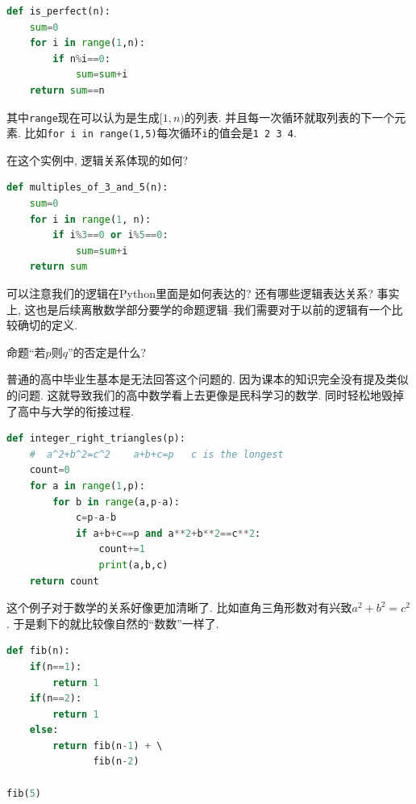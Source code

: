 
\begin{lstlisting}[language=Python]
def is_perfect(n):
    sum=0
    for i in range(1,n):
        if n%i==0:
            sum=sum+i
    return sum==n    
\end{lstlisting}

其中\texttt{range}现在可以认为是生成$[1,n)$的列表. 并且每一次循环就取列表的下一个元素. 比如\texttt{for i in range(1,5)}每次循环\texttt{i}的值会是\texttt{1 2 3 4}. 

在这个实例中, 逻辑关系体现的如何? 


\begin{lstlisting}[language=Python]
def multiples_of_3_and_5(n):
    sum=0
    for i in range(1, n):
        if i%3==0 or i%5==0:
            sum=sum+i
    return sum   	
\end{lstlisting}

可以注意我们的逻辑在Python里面是如何表达的? 还有哪些逻辑表达关系? 事实上, 这也是后续离散数学部分要学的命题逻辑--我们需要对于以前的逻辑有一个比较确切的定义. 

\begin{bonus}
	命题``若$p$则$q$''的否定是什么? 
\end{bonus}

普通的高中毕业生基本是无法回答这个问题的. 因为课本的知识完全没有提及类似的问题. 这就导致我们的高中数学看上去更像是民科学习的数学. 同时轻松地毁掉了高中与大学的衔接过程. 



\begin{lstlisting}[language=Python]
def integer_right_triangles(p):
    #  a^2+b^2=c^2    a+b+c=p   c is the longest
    count=0
    for a in range(1,p):
        for b in range(a,p-a):
            c=p-a-b
            if a+b+c==p and a**2+b**2==c**2:
                count+=1
                print(a,b,c)
    return count   
\end{lstlisting}

这个例子对于数学的关系好像更加清晰了. 比如直角三角形数对有兴致$a^2+b^2=c^2$. 于是剩下的就比较像自然的``数数''一样了. 
    
\begin{lstlisting}[language=Python]
def fib(n):
    if(n==1): 
        return 1
    if(n==2): 
        return 1
    else: 
        return fib(n-1) + \ 
               fib(n-2)

fib(5)
\end{lstlisting}

